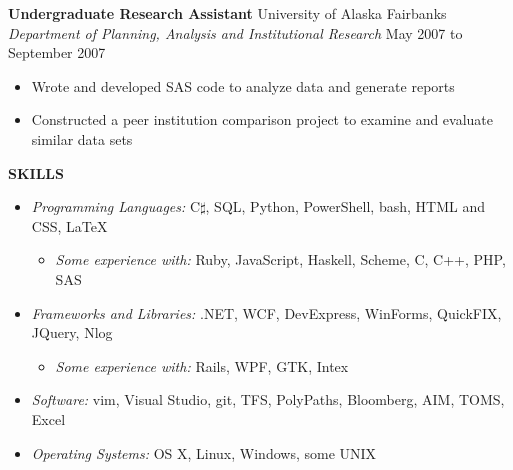 \documentclass{article}
\begin{document}
\begin{flushleft}
\hspace{20pt}
\textbf{Undergraduate Research Assistant} \hfill University of Alaska Fairbanks\\
\hspace{20pt}
\textit{Department of Planning, Analysis and Institutional Research} \hfill May 2007 to September 2007\\
\begin{itemize}[leftmargin=50pt,itemsep=-1pt]
\item Wrote and developed SAS code to analyze data and generate reports
\item Constructed a peer institution comparison project to examine and evaluate similar data sets
\end{itemize}

\vspace{5pt}
\textbf{SKILLS}\\
\begin{itemize}[leftmargin=20pt,itemsep=-1pt]
\item[] \textit{Programming Languages:} C$\sharp$, SQL, Python, PowerShell, bash, HTML and CSS, \LaTeX\\
    \begin{itemize}[leftmargin=20pt,itemsep=-1pt,nosep]
        \item[] \textit{Some experience with:} Ruby, JavaScript, Haskell, Scheme, C, C++, PHP, SAS
    \end{itemize}
\item[] \textit{Frameworks and Libraries:} .NET, WCF, DevExpress, WinForms, QuickFIX, JQuery, Nlog\\
    \begin{itemize}[leftmargin=20pt,itemsep=-1pt,nosep]
        \item[] \textit{Some experience with:} Rails, WPF, GTK, Intex
    \end{itemize}
\item[] \textit{Software:} vim, Visual Studio, git, TFS, PolyPaths, Bloomberg, AIM, TOMS, Excel\\
\item[] \textit{Operating Systems:} OS X, Linux, Windows, some UNIX\\
\end{itemize}

\end{flushleft}
\end{document}

